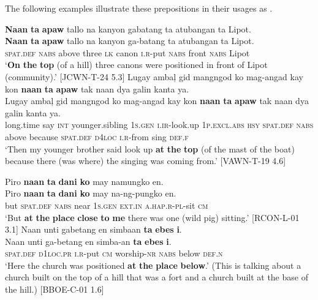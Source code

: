 The following examples illustrate these prepositions in their usages as .

\ea
\textbf{Naan}  \textbf{ta}  \textbf{apaw}  tallo  na  kanyon  gabatang  ta  atubangan  ta  Lipot. \\\smallskip
 \gll \textbf{Naan}  \textbf{ta}  \textbf{apaw}  tallo  na  kanyon  ga-batang  ta  atubangan  ta  Lipot. \\
\textsc{spat.def}  \textsc{nabs}  above  three  \textsc{lk}  canon  \textsc{i.r}-put  \textsc{nabs}  front  \textsc{nabs}  Lipot \\
\glt ‘\textbf{On} \textbf{the} \textbf{top} (of a hill) three canons were positioned in front of Lipot (community).’ [JCWN-T-24 5.3]
\z
\ea
Lugay  ambaļ  gid  mangngod  ko  mag-angad  kay  kon  \textbf{naan}  \textbf{ta}  \textbf{apaw}  tak  naan  dya  galin  kanta  ya. \\\smallskip
 \gll Lugay  ambaļ  gid  mangngod  ko  mag-angad  kay  kon  \textbf{naan}  \textbf{ta}  \textbf{apaw}  tak  naan  dya  galin  kanta  ya. \\
long.time  say  \textsc{int}  younger.sibling  1\textsc{s.gen}  \textsc{i.ir}-look.up 1\textsc{p.excl.abs}  \textsc{hsy} \textsc{spat.def}  \textsc{nabs}  above  because  \textsc{spat.def}  \textsc{d}4\textsc{loc}  \textsc{i.r}-from  sing  \textsc{def.f} \\
\glt `Then my younger brother said look up \textbf{at} \textbf{the} \textbf{top} (of the mast of the boat) because there (was where) the singing was coming from.’ [VAWN-T-19 4.6]
\z


\ea
Piro  \textbf{naan}  \textbf{ta}  \textbf{dani}  \textbf{ko}  may  namungko  en. \\\smallskip
 \gll Piro  \textbf{naan}  \textbf{ta}  \textbf{dani}  \textbf{ko}  may  na-ng-pungko  en. \\
but  \textsc{spat.def}  \textsc{nabs}  near  1\textsc{s.gen}  \textsc{ext.in}  \textsc{a.hap.r-pl}-sit  \textsc{cm} \\
\glt ‘But \textbf{at} \textbf{the} \textbf{place} \textbf{close} \textbf{to} \textbf{me} there was one (wild pig) sitting.’ [RCON-L-01 3.1]
\z
\ea
Naan  unti  gabetang  en  simbaan  \textbf{ta}  \textbf{ebes}  \textbf{i}. \\\smallskip
 \gll Naan  unti  ga-betang  en  simba-an  \textbf{ta}  \textbf{ebes}  \textbf{i}. \\
\textsc{spat.def}  \textsc{d}1\textsc{loc.pr}  \textsc{i.r}-put  \textsc{cm}  worship-\textsc{nr}  \textsc{nabs}  below  \textsc{def.n} \\
\glt ‘Here the church was positioned \textbf{at} \textbf{the} \textbf{place} \textbf{below}.’ (This is talking about a church built on the top of a hill that was a fort and a church built at the base of the hill.) [BBOE-C-01 1.6]
\z

